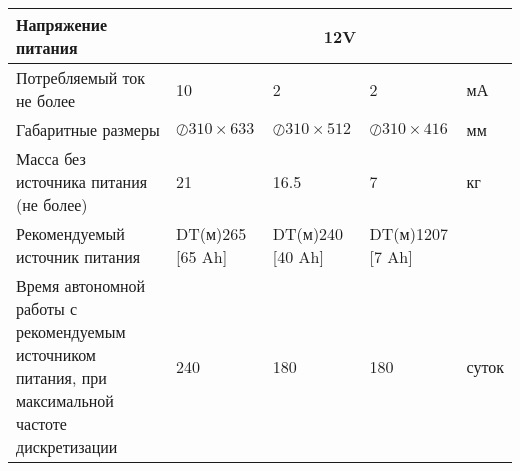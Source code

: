\begin{longtable}{|X |X |X |X| X|}
  \hline
        Напряжение питания & \multicolumn{4}{|c|}{12V} \\
  \hline
        Потребляемый ток не более & 10 & 2 & 2 & мА  \\
  \hline
        Габаритные размеры & $\oslash310\times633$ & $\oslash310\times512$ & $\oslash310\times416$ & мм  \\
  \hline
        Масса без источника питания (не более) & 21 & 16.5 & 7 & кг  \\
  \hline
        Рекомендуемый источник питания & DT(м)265 [65 Ah]  & DT(м)240 [40 Ah] & DT(м)1207 [7 Ah] &   \\
  \hline
        Время автономной работы с рекомендуемым источником питания, при максимальной частоте дискретизации & 240 & 180 & 180 & суток  \\
  \hline
  \hline
\end{longtable}
